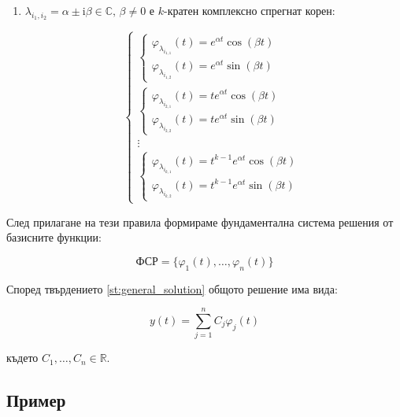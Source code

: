 \documentclass{scrartcl}
\begin{document}
\begin{FlushLeft}
\begin{enumerate}
    $$
    \begin{cases}
        \varphi_{\lambda_{i_1}}(t) = e^{\alpha t}\cos{(\beta t)}\\
        \varphi_{\lambda_{i_2}}(t) = e^{\alpha t}\sin{(\beta t)}
    \end{cases}
    $$
    
    \item $\lambda_{i_1, i_2} = \alpha \pm \mathrm{i} \beta\in \mathbb{C}, \, \beta \ne 0$ е $k$-кратен комплексно спрегнат корен:

    $$
    \begin{cases}
        \begin{cases}
            \varphi_{\lambda_{i_{1, 1}}}(t) = e^{\alpha t}\cos{(\beta t)}\\
            \varphi_{\lambda_{i_{1, 2}}}(t) = e^{\alpha t}\sin{(\beta t)}
        \end{cases}\\
        \begin{cases}
            \varphi_{\lambda_{i_{2, 1}}}(t) = te^{\alpha t}\cos{(\beta t)}\\
            \varphi_{\lambda_{i_{2, 2}}}(t) = te^{\alpha t}\sin{(\beta t)}
        \end{cases}\\
        \vdots\\
        \begin{cases}
            \varphi_{\lambda_{i_{k, 1}}}(t) = t^{k-1}e^{\alpha t}\cos{(\beta t)}\\
            \varphi_{\lambda_{i_{k, 2}}}(t) = t^{k-1}e^{\alpha t}\sin{(\beta t)}
        \end{cases}
    \end{cases}
    $$
\end{enumerate}

След прилагане на тези правила формираме фундаментална система решения от базисните функции:

$$\text{ФСР} = \{\varphi_1(t), \dots, \varphi_n(t)\}$$

Според твърдението \ref{st:general_solution} общото решение има вида:

$$y(t) = \sum_{j=1}^n C_j \varphi_j(t)$$

където $C_1, \dots, C_n \in \mathbb{R}$.

\subsection{Пример}


\end{FlushLeft}
\end{document}
